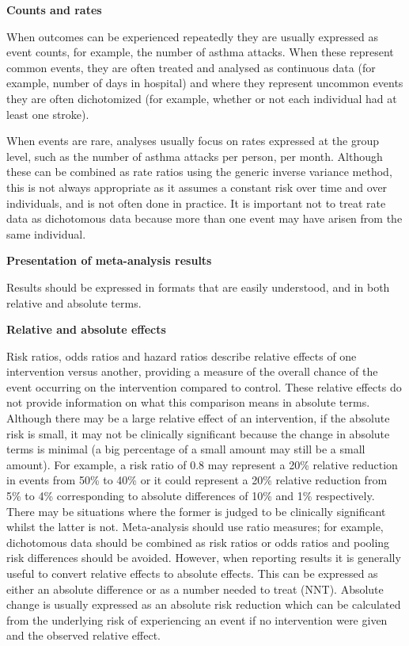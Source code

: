 \documentclass[
  11pt,
  a4paper,
  DIV=11,
  numbers=noendperiod]{scrreprt}
\begin{document}
\textbf{Counts and rates}

When outcomes can be experienced repeatedly they are usually expressed
as event counts, for example, the number of asthma attacks. When these
represent common events, they are often treated and analysed as
continuous data (for example, number of days in hospital) and where they
represent uncommon events they are often dichotomized (for example,
whether or not each individual had at least one stroke).

When events are rare, analyses usually focus on rates expressed at the
group level, such as the number of asthma attacks per person, per month.
Although these can be combined as rate ratios using the generic inverse
variance method, this is not always appropriate as it assumes a constant
risk over time and over individuals, and is not often done in practice.
It is important not to treat rate data as dichotomous data because more
than one event may have arisen from the same individual.

\textbf{Presentation of meta-analysis results}

Results should be expressed in formats that are easily understood, and
in both relative and absolute terms.

\textbf{Relative and absolute effects}

Risk ratios, odds ratios and hazard ratios describe relative effects of
one intervention versus another, providing a measure of the overall
chance of the event occurring on the intervention compared to control.
These relative effects do not provide information on what this
comparison means in absolute terms. Although there may be a large
relative effect of an intervention, if the absolute risk is small, it
may not be clinically significant because the change in absolute terms
is minimal (a big percentage of a small amount may still be a small
amount). For example, a risk ratio of 0.8 may represent a 20\% relative
reduction in events from 50\% to 40\% or it could represent a 20\%
relative reduction from 5\% to 4\% corresponding to absolute differences
of 10\% and 1\% respectively. There may be situations where the former
is judged to be clinically significant whilst the latter is not.
Meta-analysis should use ratio measures; for example, dichotomous data
should be combined as risk ratios or odds ratios and pooling risk
differences should be avoided. However, when reporting results it is
generally useful to convert relative effects to absolute effects. This
can be expressed as either an absolute difference or as a number needed
to treat (NNT). Absolute change is usually expressed as an absolute risk
reduction which can be calculated from the underlying risk of
experiencing an event if no intervention were given and the observed
relative effect.
\end{document}
